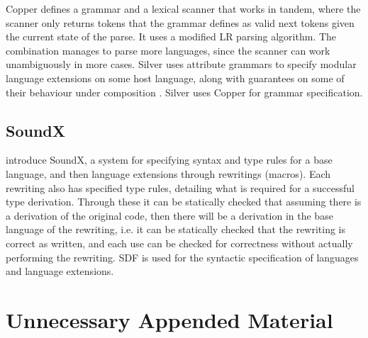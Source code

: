 \documentclass{kththesis}
\begin{document}
Copper \cite{VanWyk2007} defines a grammar and a lexical scanner that works in tandem, where the scanner only returns tokens that the grammar defines as valid next tokens given the current state of the parse. It uses a modified LR parsing algorithm. The combination manages to parse more languages, since the scanner can work unambiguously in more cases. Silver \cite{VanWyk2010} uses attribute grammars to specify modular language extensions on some host language, along with guarantees on some of their behaviour under composition \cite{Kaminski2017}. Silver uses Copper for grammar specification.

\section{SoundX}

\textcite{Lorenzen2016} introduce SoundX, a system for specifying syntax and type rules for a base language, and then language extensions through rewritings (macros). Each rewriting also has specified type rules, detailing what is required for a successful type derivation. Through these it can be statically checked that assuming there is a derivation of the original code, then there will be a derivation in the base language of the rewriting, i.e. it can be statically checked that the rewriting is correct as written, and each use can be checked for correctness without actually performing the rewriting. SDF is used for the syntactic specification of languages and language extensions.

\printbibliography[heading=bibintoc] %

\appendix

\chapter{Unnecessary Appended Material}
\end{document}
